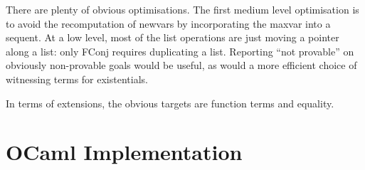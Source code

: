\documentclass[11pt,a4paper]{article}
\begin{document}
There are plenty of obvious optimisations. The first medium level
optimisation is to avoid the recomputation of newvars by incorporating
the maxvar into a sequent. At a low level, most of the list operations
are just moving a pointer along a list: only FConj requires
duplicating a list. Reporting ``not provable'' on obviously non-provable
goals would be useful, as would a more efficient choice of witnessing
terms for existentials.

In terms of extensions, the obvious targets
are function terms and equality. 



\section{OCaml Implementation}
\end{document}
